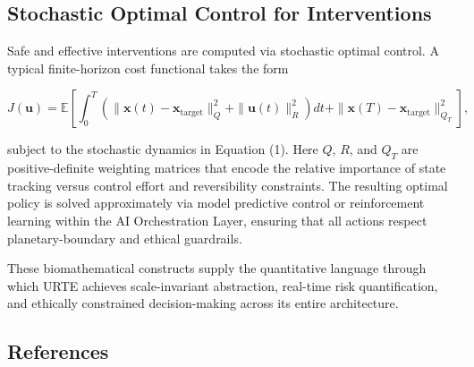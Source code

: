 \documentclass[11pt,a4paper]{article}
\begin{document}
\subsection{Stochastic Optimal Control for Interventions}

Safe and effective interventions are computed via stochastic optimal control. A typical finite-horizon cost functional takes the form

\begin{equation}
J(\mathbf{u}) = \mathbb{E}\left[ \int_0^T \left( \|\mathbf{x}(t) - \mathbf{x}_{\text{target}}\|^2_Q + \|\mathbf{u}(t)\|^2_R \right) dt + \|\mathbf{x}(T) - \mathbf{x}_{\text{target}}\|^2_{Q_T} \right],
\end{equation}

subject to the stochastic dynamics in Equation (1). Here $Q$, $R$, and $Q_T$ are positive-definite weighting matrices that encode the relative importance of state tracking versus control effort and reversibility constraints. The resulting optimal policy is solved approximately via model predictive control or reinforcement learning within the AI Orchestration Layer, ensuring that all actions respect planetary-boundary and ethical guardrails.

These biomathematical constructs supply the quantitative language through which URTE achieves scale-invariant abstraction, real-time risk quantification, and ethically constrained decision-making across its entire architecture.

\subsection{References}
\end{document}

